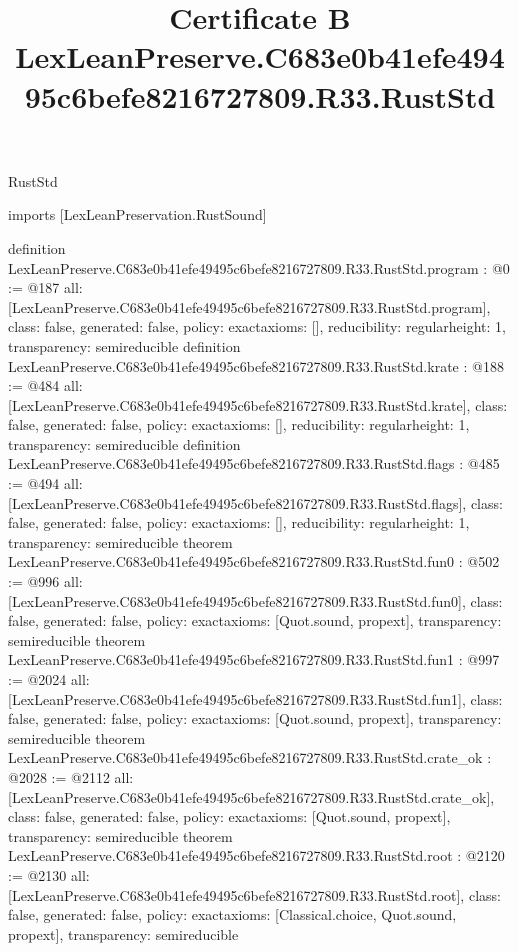 \begin{lexlean}{RustStd}
\title{Certificate B LexLeanPreserve.C683e0b41efe49495c6befe8216727809.R33.RustStd}
\begin{coremodule}
imports [LexLeanPreservation.RustSound]

definition LexLeanPreserve.C683e0b41efe49495c6befe8216727809.R33.RustStd.program : @0 := @187 {
  all: [LexLeanPreserve.C683e0b41efe49495c6befe8216727809.R33.RustStd.program],
  class: false,
  generated: false,
  policy: exact{axioms: []},
  reducibility: regular{height: 1},
  transparency: semireducible
}
definition LexLeanPreserve.C683e0b41efe49495c6befe8216727809.R33.RustStd.krate : @188 := @484 {
  all: [LexLeanPreserve.C683e0b41efe49495c6befe8216727809.R33.RustStd.krate],
  class: false,
  generated: false,
  policy: exact{axioms: []},
  reducibility: regular{height: 1},
  transparency: semireducible
}
definition LexLeanPreserve.C683e0b41efe49495c6befe8216727809.R33.RustStd.flags : @485 := @494 {
  all: [LexLeanPreserve.C683e0b41efe49495c6befe8216727809.R33.RustStd.flags],
  class: false,
  generated: false,
  policy: exact{axioms: []},
  reducibility: regular{height: 1},
  transparency: semireducible
}
theorem LexLeanPreserve.C683e0b41efe49495c6befe8216727809.R33.RustStd.fun0 : @502 := @996 {
  all: [LexLeanPreserve.C683e0b41efe49495c6befe8216727809.R33.RustStd.fun0],
  class: false,
  generated: false,
  policy: exact{axioms: [Quot.sound, propext]},
  transparency: semireducible
}
theorem LexLeanPreserve.C683e0b41efe49495c6befe8216727809.R33.RustStd.fun1 : @997 := @2024 {
  all: [LexLeanPreserve.C683e0b41efe49495c6befe8216727809.R33.RustStd.fun1],
  class: false,
  generated: false,
  policy: exact{axioms: [Quot.sound, propext]},
  transparency: semireducible
}
theorem LexLeanPreserve.C683e0b41efe49495c6befe8216727809.R33.RustStd.crate_ok : @2028 := @2112 {
  all: [LexLeanPreserve.C683e0b41efe49495c6befe8216727809.R33.RustStd.crate_ok],
  class: false,
  generated: false,
  policy: exact{axioms: [Quot.sound, propext]},
  transparency: semireducible
}
theorem LexLeanPreserve.C683e0b41efe49495c6befe8216727809.R33.RustStd.root : @2120 := @2130 {
  all: [LexLeanPreserve.C683e0b41efe49495c6befe8216727809.R33.RustStd.root],
  class: false,
  generated: false,
  policy: exact{axioms: [Classical.choice, Quot.sound, propext]},
  transparency: semireducible
}


\end{coremodule}
\end{lexlean}
